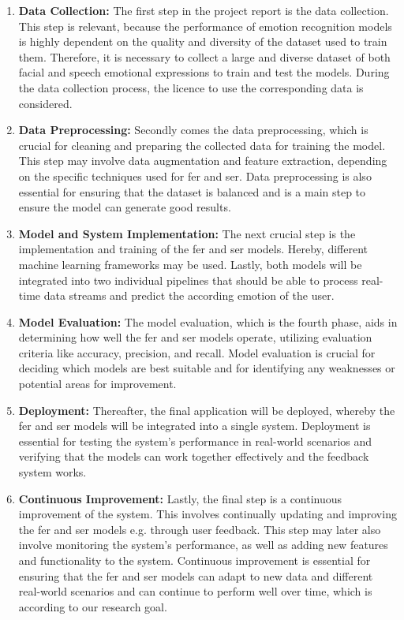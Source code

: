 \begin{enumerate}
\color{blue}
    \item \textbf{Data Collection:}
    The first step in the project report is the data collection. This step is relevant, because the performance of emotion recognition models is highly dependent on the quality and diversity of the dataset used to train them. Therefore, it is necessary to collect a large and diverse dataset of both facial and speech emotional expressions to train and test the models. During the data collection process, the licence to use the corresponding data is considered.
    
    \item \textbf{Data Preprocessing:}
    Secondly comes the data preprocessing, which is crucial for cleaning and preparing the collected data for training the model. This step may involve data augmentation and feature extraction, depending on the specific techniques used for \acrshort{fer} and \acrshort{ser}. Data preprocessing is also essential for ensuring that the dataset is balanced and is a main step to ensure the model can generate good results.
    
    \item \textbf{Model and System Implementation:}
    The next crucial step is the implementation and training of the \acrshort{fer} and \acrshort{ser} models. Hereby, different machine learning frameworks may be used. Lastly, both models will be integrated into two individual pipelines that should be able to process real-time data streams and predict the according emotion of the user. 
    
    \item \textbf{Model Evaluation:}
    The model evaluation, which is the fourth phase, aids in determining how well the \acrshort{fer} and \acrshort{ser} models operate, utilizing evaluation criteria like accuracy, precision, and recall. Model evaluation is crucial for deciding which models are best suitable and for identifying any weaknesses or potential areas for improvement.
        
    \item \textbf{Deployment:}
    Thereafter, the final application will be deployed, whereby the \acrshort{fer} and \acrshort{ser} models will be integrated into a single system. Deployment is essential for testing the system's performance in real-world scenarios and verifying that the models can work together effectively and the feedback system works.
    
    \item \textbf{Continuous Improvement:}
    Lastly, the final step is a continuous improvement of the system. This involves continually updating and improving the \acrshort{fer} and \acrshort{ser} models e.g. through user feedback. This step may later also involve monitoring the system's performance, as well as adding new features and functionality to the system. Continuous improvement is essential for ensuring that the \acrshort{fer} and \acrshort{ser} models can adapt to new data and different real-world scenarios and can continue to perform well over time, which is according to our research goal. 
\end{enumerate}

